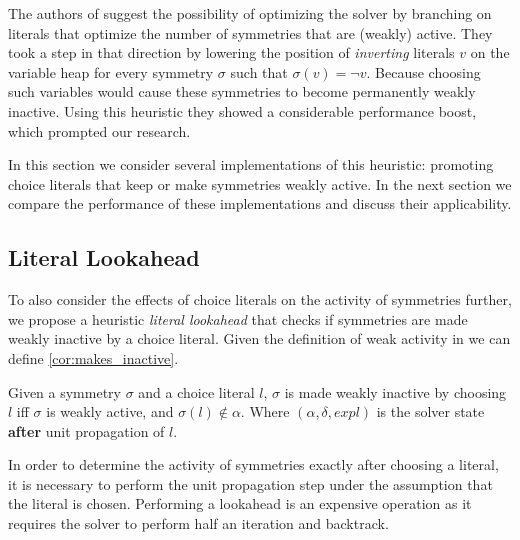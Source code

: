 
The authors of \cite{devriendt2012symmetry,katebi2010symmetry}  suggest the possibility of optimizing the solver by
branching on literals that optimize the number of symmetries that are (weakly) active.
They took a step in that direction by lowering the position of \emph{inverting} literals $v$ on the variable heap for
every symmetry $\sigma$ such that $\sigma(v) = \neg v$.
Because choosing such variables would cause these symmetries to become permanently weakly inactive.
Using this heuristic they showed a considerable performance boost, which prompted our research.

In this section we consider several implementations of this heuristic: promoting choice literals
that keep or make symmetries weakly active.
In the next section we compare the performance of these implementations and discuss their
applicability.

\subsection{Literal Lookahead}
	To also consider the effects of choice literals on the activity of symmetries further,
	we propose a heuristic \emph{literal lookahead} that checks if symmetries are made weakly inactive by a choice literal.
	Given the definition of weak activity in \cite{devriendt2012symmetry} we can define \cref{cor:makes_inactive}.\\

	\begin{corollary}
		\label{cor:makes_inactive}
		Given a symmetry $\sigma$ and a choice literal $l$,
		$\sigma$ is made weakly inactive by choosing $l$ iff
		$\sigma$ is weakly active, and $\sigma(l) \notin \alpha$.
		Where $(\alpha,\delta,\textit{expl})$ is the solver state \textbf{after} unit propagation of $l$. 
	\end{corollary}

	In order to determine the activity of symmetries exactly after choosing a literal,
	it is necessary to perform the unit propagation step under the assumption that the literal is chosen.
	Performing a lookahead is an expensive operation as it requires the solver to perform half an
	iteration and backtrack.

